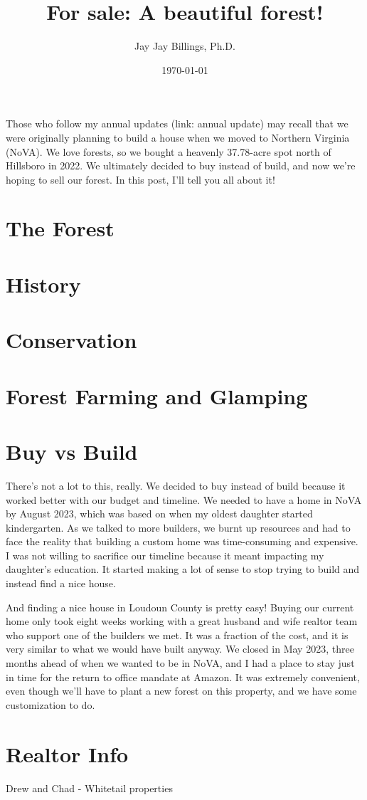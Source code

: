 \documentclass{article}
\title{For sale: A beautiful forest!}
\author{Jay Jay Billings, Ph.D.}
\date{\today}
\begin{document}
\maketitle

Those who follow my annual updates (link: annual update) may recall that we were originally planning to build a house when we moved to Northern Virginia (NoVA). We love forests, so we bought a heavenly 37.78-acre spot north of Hillsboro in 2022. We ultimately decided to buy instead of build, and now we're hoping to sell our forest. In this post, I'll tell you all about it! 

\section*{The Forest}

\section*{History}

\section*{Conservation}

\section*{Forest Farming and Glamping}

\section*{Buy vs Build}

There's not a lot to this, really. We decided to buy instead of build because it worked better with our budget and timeline. We needed to have a home in NoVA by August 2023, which was based on when my oldest daughter started kindergarten. As we talked to more builders, we burnt up resources and had to face the reality that building a custom home was time-consuming and expensive. I was not willing to sacrifice our timeline because it meant impacting my daughter's education. It started making a lot of sense to stop trying to build and instead find a nice house. 

And finding a nice house in Loudoun County is pretty easy! Buying our current home only took eight weeks working with a great husband and wife realtor team who support one of the builders we met. It was a fraction of the cost, and it is very similar to what we would have built anyway. We closed in May 2023, three months ahead of when we wanted to be in NoVA, and I had a place to stay just in time for the return to office mandate at Amazon. It was extremely convenient, even though we'll have to plant a new forest on this property, and we have some customization to do. 

\section*{Realtor Info}

Drew and Chad - Whitetail properties
\end{document}
